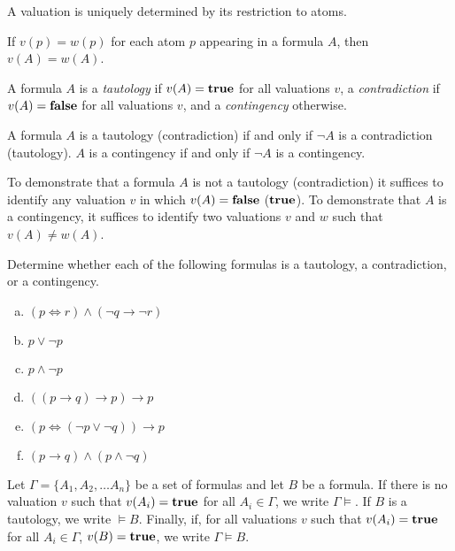 \documentclass{article}
\begin{document}
\begin{proposition}
A valuation is uniquely determined by its restriction to atoms.
\end{proposition}

\begin{proposition}
If $v(p) = w(p)$ for each atom $p$ appearing in a formula $A$, then $v(A) = w(A)$.
\end{proposition}

\begin{definition}
    A formula $A$ is a \emph{tautology} if $v(A) = \mathbf{true}$ for all valuations $v$, a \emph{contradiction} if $v(A) = \mathbf{false}$ for all valuations $v$, and a \emph{contingency} otherwise.
\end{definition}

\begin{proposition}
A formula $A$ is a tautology (contradiction) if and only if $\neg A$ is a contradiction (tautology). $A$ is a contingency if and only if $\neg A$ is a contingency.
\end{proposition}

\begin{proposition}
To demonstrate that a formula $A$ is not a tautology (contradiction) it suffices to identify any valuation $v$ in which $v(A) = \mathbf{false}$ ($\mathbf{true}$). To demonstrate that $A$ is a contingency, it suffices to identify two valuations $v$ and $w$ such that $v(A) \neq w(A)$.
\end{proposition}

\begin{prob}{2.1}
    Determine whether each of the following formulas is a tautology, a contradiction, or a contingency.
    \begin{multicols}{2}
    \begin{enumerate}[a)]
    \item $(p \iff r) \wedge (\neg q \to \neg r)$
    \item $p \vee \neg p$
    \item $p \wedge \neg p$
    \item $((p \to q) \to p) \to p$
    \item $(p \iff (\neg p \vee \neg q)) \to p$
    \item $(p \to q) \wedge (p \wedge \neg q)$
    \end{enumerate}
    \end{multicols}
\end{prob}

\begin{definition}
    Let $\Gamma = \{A_1, A_2, \dots A_n \}$ be a set of formulas and let $B$ be a formula. If there is no valuation $v$ such that $v(A_i) = \mathbf{true}$ for all $A_i \in \Gamma$, we write $\Gamma \models$. If $B$ is a tautology, we write $\models B$. Finally, if, for all valuations $v$ such that $v(A_i) = \mathbf{true}$ for all $A_i \in \Gamma$, $v(B) = \mathbf{true}$, we write $\Gamma \models B$. 
\end{definition}
\end{document}
